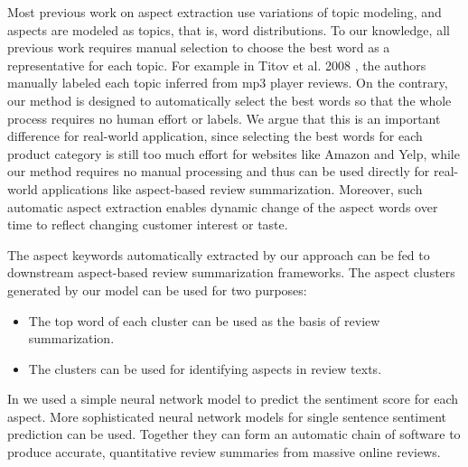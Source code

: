 Most previous work on aspect extraction use variations of 
topic modeling, and aspects are modeled as topics, that is, 
word distributions. To our knowledge, all previous work requires 
manual selection to choose the best word as a representative for 
each topic. For example in Titov et al. 2008 \cite{titov2008modeling}, 
the authors manually labeled each topic inferred from mp3 player reviews. 
On the contrary, our method is designed to automatically select the 
best words so that the whole process requires no human effort or labels. 
We argue that this is an important difference for real-world application, 
since selecting the best words for each product category is still 
too much effort for websites like Amazon and Yelp, while 
our method requires no manual processing and thus can be 
used directly for real-world applications like aspect-based 
review summarization. Moreover, such automatic aspect extraction enables
dynamic change of the aspect words over time to reflect changing customer
interest or taste.

The aspect keywords automatically extracted by our approach can be
fed to downstream aspect-based review summarization frameworks. 
The aspect clusters generated by our model can be used for two purposes:
\begin{itemize}
    \item The top word of each cluster can be used as the basis of
          review summarization.
    \item The clusters can be used for identifying aspects in review texts.
\end{itemize}
In  we used a simple neural network model to predict
the sentiment score for each aspect. More sophisticated  
neural network models for single sentence sentiment prediction
\cite{maas2011learning,socher2013recursive,dos2014deep,tang2015document}
can be used. Together they can form an automatic chain of software to
produce accurate, quantitative review summaries from massive online reviews.
